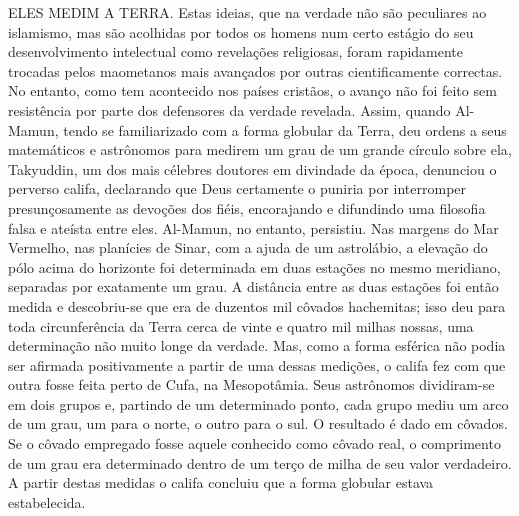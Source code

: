 \documentclass[11pt,a5paper,twoside,openany]{book}
\begin{document}
ELES MEDIM A TERRA. Estas ideias, que na verdade não são peculiares ao islamismo, mas são acolhidas por todos os homens num certo estágio do seu desenvolvimento intelectual como revelações religiosas, foram rapidamente trocadas pelos maometanos mais avançados por outras cientificamente correctas. No entanto, como tem acontecido nos países cristãos, o avanço não foi feito sem resistência por parte dos defensores da verdade revelada. Assim, quando Al-Mamun, tendo se familiarizado com a forma globular da Terra, deu ordens a seus matemáticos e astrônomos para medirem um grau de um grande círculo sobre ela, Takyuddin, um dos mais célebres doutores em divindade da época, denunciou o perverso califa, declarando que Deus certamente o puniria por interromper presunçosamente as devoções dos fiéis, encorajando e difundindo uma filosofia falsa e ateísta entre eles. Al-Mamun, no entanto, persistiu. Nas margens do Mar Vermelho, nas planícies de Sinar, com a ajuda de um astrolábio, a elevação do pólo acima do horizonte foi determinada em duas estações no mesmo meridiano, separadas por exatamente um grau. A distância entre as duas estações foi então medida e descobriu-se que era de duzentos mil côvados hachemitas; isso deu para toda circunferência da Terra cerca de vinte e quatro mil milhas nossas, uma determinação não muito longe da verdade. Mas, como a forma esférica não podia ser afirmada positivamente a partir de uma dessas medições, o califa fez com que outra fosse feita perto de Cufa, na Mesopotâmia. Seus astrônomos dividiram-se em dois grupos e, partindo de um determinado ponto, cada grupo mediu um arco de um grau, um para o norte, o outro para o sul. O resultado é dado em côvados. Se o côvado empregado fosse aquele conhecido como côvado real, o comprimento de um grau era determinado dentro de um terço de milha de seu valor verdadeiro. A partir destas medidas o califa concluiu que a forma globular estava estabelecida.
\end{document}
